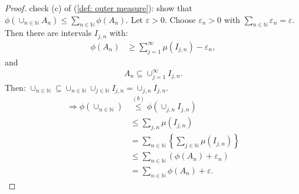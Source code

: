 \documentclass[../../note.tex]{subfiles}
\begin{document}
\begin{example}
\begin{proof}
        check (c) of (\ref{def: outer measure}): show that $\phi(\cup_{n \in \mathbb{N}}A_n) \leq \sum_{n \in \mathbb{N}} \phi(A_n)$. Let $\varepsilon > 0$. Choose $\varepsilon_n > 0 $ with $\sum_{n \in \mathbb{N}} \varepsilon_n = \varepsilon$. Then there are intervals $I_{j,n}$ with:
        \begin{align}
            \phi(A_n)
            &\geq \sum_{j=1}^{\infty} \mu(I_{j,n}) - \varepsilon_n,
        \end{align}
        and
        \begin{align}
            A_n \subseteq \cup_{j=1}^{\infty} I_{j,n}.
        \end{align}
        Then: $\cup_{n \in \mathbb{N}} \subseteq \cup_{n \in \mathbb{N}} \cup_{j \in \mathbb{N}} I_{j,n} = \cup_{j,n} I_{j,n}$.
        \begin{align}
            \Longrightarrow \phi(\cup_{n \in \mathbb{N}}) 
            &\stackrel{(b)}{\leq} \phi(\cup_{j,n} I_{j,n}) \\
            &\leq \sum_{j,n} \mu(I_{j,n}) \\
            &= \sum_{n \in \mathbb{N}} \left\{\sum_{j \in \mathbb{N}} \mu(I_{j,n})\right\} \\
            &\leq \sum_{n \in \mathbb{N}}\left(\phi(A_n)+\varepsilon_n \right) \\
            &= \sum_{n \in \mathbb{N}} \phi(A_n) + \varepsilon.
        \end{align}
    \end{proof}
\end{example}
\end{document}
